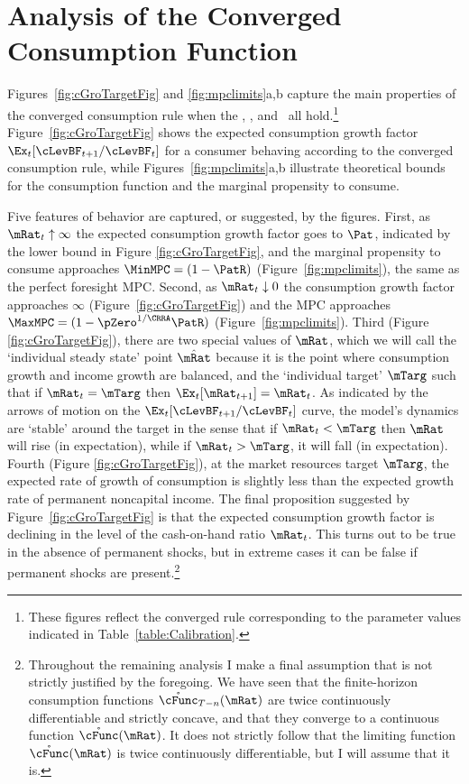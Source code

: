 \documentclass[BufferStockTheory]{subfiles}
\begin{document}
\hypertarget{AnalysisoftheConvergedConsumptionFunction}{}
\section{Analysis of the Converged Consumption Function}

Figures~\ref{fig:cGroTargetFig} and \ref{fig:mpclimits}a,b capture the
main properties of the converged consumption rule when the \RIC, \GICNrm,
and \FHWC~all hold.\footnote{These figures reflect the converged rule
  corresponding to the parameter values indicated in
  Table~\ref{table:Calibration}.}  Figure~\ref{fig:cGroTargetFig}
shows the expected consumption growth factor
$\Ex_{t}[\cLevBF_{t+1}/\cLevBF_{t}]$ for a consumer behaving according to
the converged consumption rule, while Figures~\ref{fig:mpclimits}a,b
illustrate theoretical bounds for the consumption function and the
marginal propensity to consume.

Five features of behavior are captured, or suggested, by the
figures. First, as $\mRat_{t} \uparrow \infty$ the expected
consumption growth factor goes to ${\Pat}$, indicated by the lower
bound in Figure \ref{fig:cGroTargetFig}, and the marginal propensity
to consume approaches $\MinMPC=(1-\PatR)$
(Figure~\ref{fig:mpclimits}), the same as the perfect foresight MPC.  Second, as $\mRat_t \downarrow 0$ the consumption
growth factor approaches $\infty$ (Figure~\ref{fig:cGroTargetFig}) and
the MPC approaches $\MaxMPC=(1-\pZero^{1/\CRRA}\PatR)$ (Figure~\ref{fig:mpclimits}).  Third (Figure \ref{fig:cGroTargetFig}), there are two special values of $\mRat$, which
we will call the `individual steady state' point $\mBal$ because it is the point where consumption growth and income growth are balanced, and the `individual target' $\mTarg$  such that if $\mRat_t = \mTarg$ then $\Ex_t [
{\mRat}_{t+1}] = \mRat_t$.  As indicated by the arrows of motion
on the $\Ex_{t}[\cLevBF_{t+1}/\cLevBF_{t}]$ curve, the model's dynamics
are `stable' around the target in the sense that if $\mRat_{t} <
\mTarg$ then $\mRat$ will rise (in expectation), while if
$\mRat_{t} > \mTarg$, it will fall (in expectation).  Fourth (Figure
\ref{fig:cGroTargetFig}), at the market resources target $\mTarg$, the expected rate of
growth of consumption is slightly less than the expected growth rate
of permanent noncapital income. The final proposition suggested by
Figure~\ref{fig:cGroTargetFig} is that the expected consumption growth
factor is declining in the level of the cash-on-hand ratio
$\mRat_{t}$.  This turns out to be true in the absence of permanent
shocks, but in extreme cases it can be false if permanent shocks are
present.\footnote{Throughout the remaining analysis I make a final
  assumption that is not strictly justified by the foregoing.  We have
  seen that the finite-horizon consumption functions
  $\mathring{\cFunc}_{T-n}(\mRat)$ are twice continuously differentiable and
  strictly concave, and that they converge to a continuous function
  $\mathring{\cFunc}(\mRat)$.  It does not strictly follow that the limiting
  function $\mathring{\cFunc}(\mRat)$ is twice continuously differentiable, but I
  will assume that it is.}
\end{document}
